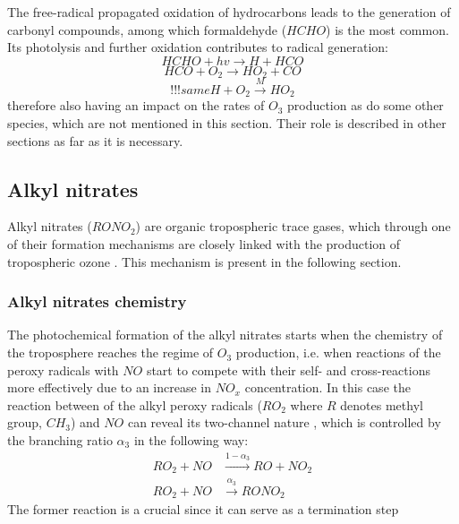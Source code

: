 \documentclass[11pt,a4paper]{article}
\begin{document}
The free-radical propagated oxidation of hydrocarbons leads to the generation of carbonyl compounds, among which formaldehyde ($HCHO$) is the most common. Its photolysis and further oxidation contributes to radical generation:
\begin{equation}\label{reac:HCHO+hv=H+HCO}
HCHO + hv \rightarrow H + HCO
\end{equation}
\begin{equation}\label{reac:HCO+O2=HO2+CO}
HCO + O_2 \rightarrow HO_2 + CO
\end{equation}
\begin{equation}\label{reac:H+O2=HO2}
!!!sameH + O_2 \xrightarrow{M} HO_2
\end{equation}
therefore also having an impact on the rates of $O_3$ production \citep{Fowler2008} as do some other species, which are not mentioned in this section. Their role is described in other sections as far as it is necessary.

\subsection{Alkyl nitrates}
Alkyl nitrates ($RONO_2$) are organic tropospheric trace gases, which through one of their formation mechanisms are closely linked with the production of tropospheric ozone \citep{Reeves2007}. This mechanism is present in the following section.

\subsubsection*{Alkyl nitrates chemistry}

The photochemical formation of the alkyl nitrates starts when the chemistry of the troposphere reaches the regime of $O_3$ production, i.e. when reactions of the peroxy radicals with $NO$ start to compete with their self- and cross-reactions more effectively due to an increase in $NO_x$ concentration. In this case the reaction between of the alkyl peroxy radicals ($RO_2$ where $R$ denotes methyl group, $CH_3$) and $NO$ can reveal its two-channel nature \citep{Day2003}, which is controlled by the branching ratio $\alpha_3$ in the following way:
\begin{subequations} \label{eq:peroxy_no0}
\begin{align}
RO_2 + NO &\xrightarrow{1-\alpha_3} RO + NO_2 \label{eq:peroxy_no1}\\
RO_2 + NO &\xrightarrow{\alpha_3} RONO_2 \label{eq:peroxy_no2}
\end{align}
\end{subequations}
The former reaction is a crucial since it can serve as a termination step
\end{document}
